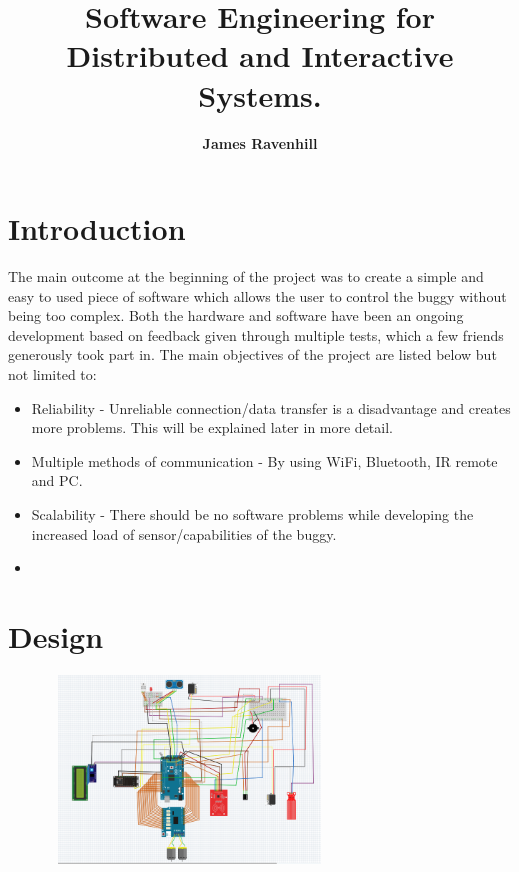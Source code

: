 \documentclass[8pt, a4paper]{article}
\begin{document}
\setlength \topmargin{-1in}
\title{\textbf{Software Engineering for Distributed and Interactive Systems.}}
\author{\textbf{James Ravenhill}}
\date{}
\maketitle

\section{Introduction} 

The main outcome at the beginning of the project was to create a simple and easy to used piece of software which allows the user to control the buggy without being too complex. Both the hardware and software have been an ongoing development based on feedback given through multiple tests, which a few friends generously took part in. The main objectives of the project are listed below but not limited to:

\begin{itemize}
	\item Reliability - Unreliable connection/data transfer is a disadvantage and creates more problems. This will be explained later in more detail.  
	\item  Multiple methods of communication - By using WiFi, Bluetooth, IR remote and PC. 
	\item Scalability - There should be no software problems while developing the increased load of sensor/capabilities of the buggy. 
	\item
\end{itemize}


\section{Design}
\begin{figure}[h]
\includegraphics[height=5cm, width=7.5cm]{schematic}
\centering
\end{figure}
\end{document}
